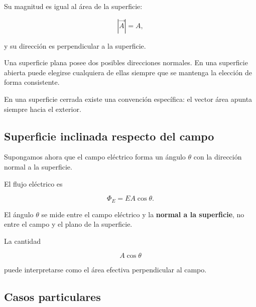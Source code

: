 Su magnitud es igual al área de la superficie:

\[
|\vec A|=A,
\]

y su dirección es perpendicular a la superficie.

Una superficie plana posee dos posibles direcciones normales. En una superficie
abierta puede elegirse cualquiera de ellas siempre que se mantenga la elección de
forma consistente.

En una superficie cerrada existe una convención específica: el vector área apunta
siempre hacia el exterior.


\subsection{Superficie inclinada respecto del campo}

Supongamos ahora que el campo eléctrico forma un ángulo \(\theta\) con la dirección
normal a la superficie.

El flujo eléctrico es

\begin{equation}
\boxed{\Phi_E=EA\cos\theta}.
\label{eq:flujo_superficie_plana}
\end{equation}

El ángulo \(\theta\) se mide entre el campo eléctrico y la \textbf{normal a la superficie},
no entre el campo y el plano de la superficie.

\begin{center}
\end{center}

La cantidad

\[
A\cos\theta
\]

puede interpretarse como el área efectiva perpendicular al campo.


\subsection{Casos particulares}

